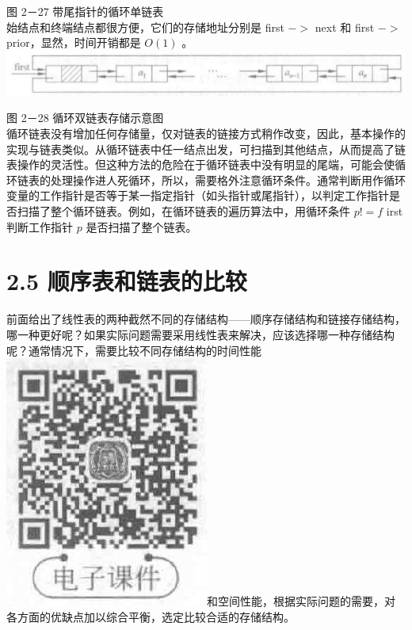 \documentclass[10pt]{article}
\begin{document}
图 2－27 带尾指针的循环单链表\\
始结点和终端结点都很方便，它们的存储地址分别是 first $->$ next 和 first $->$ prior，显然，时间开销都是 $O(1)$ 。\\
\includegraphics[max width=\textwidth, center]{2025_06_06_704745ea57b15b2333e5g-064(1)}

图 2－28 循环双链表存储示意图\\
循环链表没有增加任何存储量，仅对链表的链接方式稍作改变，因此，基本操作的实现与链表类似。从循环链表中任一结点出发，可扫描到其他结点，从而提高了链表操作的灵活性。但这种方法的危险在于循环链表中没有明显的尾端，可能会使循环链表的处理操作进人死循环，所以，需要格外注意循环条件。通常判断用作循环变量的工作指针是否等于某一指定指针（如头指针或尾指针），以判定工作指针是否扫描了整个循环链表。例如，在循环链表的遍历算法中，用循环条件 $p!=f$ irst 判断工作指针 $p$ 是否扫描了整个链表。

\section*{2.5 顺序表和链表的比较}
前面给出了线性表的两种截然不同的存储结构——顺序存储结构和链接存储结构，哪一种更好呢？如果实际问题需要采用线性表来解决，应该选择哪一种存储结构呢？通常情况下，需要比较不同存储结构的时间性能\\
\includegraphics[max width=\textwidth]{2025_06_06_704745ea57b15b2333e5g-064}和空间性能，根据实际问题的需要，对各方面的优缺点加以综合平衡，选定比较合适的存储结构。
\end{document}
